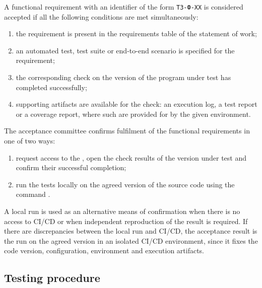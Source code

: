 \documentclass[12pt,a4paper]{extarticle}
\begin{document}
\begin{hseExample}
A functional requirement with an identifier of the form \texttt{ТЗ-Ф-XX} is considered accepted if all the following conditions are met simultaneously:

\begin{enumerate}[label=\arabic*), leftmargin=1.25cm]
    \item the requirement is present in the requirements table of the statement of work;
    \item an automated test, test suite or end-to-end scenario is specified for the requirement;
    \item the corresponding check on the version of the program under test has completed successfully;
    \item supporting artifacts are available for the check: an execution log, a test report or a coverage report, where such are provided for by the given environment.
\end{enumerate}

The acceptance committee confirms fulfilment of the functional requirements in one of two ways:

\begin{enumerate}[label=\arabic*), leftmargin=1.25cm]
    \item request access to the , open the check results of the version under test and confirm their successful completion;
    \item run the tests locally on the agreed version of the source code using the command .
\end{enumerate}

A local run is used as an alternative means of confirmation when there is no access to CI/CD or when independent reproduction of the result is required. If there are discrepancies between the local run and CI/CD, the acceptance result is the run on the agreed version in an isolated CI/CD environment, since it fixes the code version, configuration, environment and execution artifacts.
\end{hseExample}

\subsection{Testing procedure}
\end{document}
